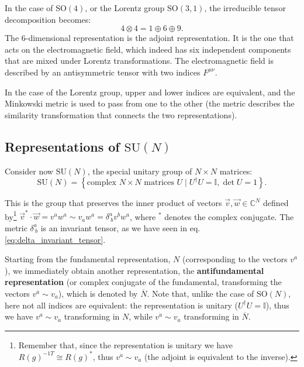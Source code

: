 \begin{example}

    In the case of \(\mathrm{SO}(4)\), or the Lorentz group \(\mathrm{SO}(3,1)\), the irreducible tensor decomposition becomes:
    \[
        4 \otimes 4 = 1 \oplus 6 \oplus 9 .
    \]
    The 6-dimensional representation is the adjoint representation. It is the one that acts on the electromagnetic field, which indeed has six independent components that are mixed under Lorentz transformations. The electromagnetic field is described by an antisymmetric tensor with two indices \(F^{\mu\nu}\).

    In the case of the Lorentz group, upper and lower indices are equivalent, and the Minkowski metric is used to pass from one to the other (the metric describes the similarity transformation that connects the two representations).
\end{example}

\subsection{Representations of \texorpdfstring{\(\mathrm{SU}(N)\)}{SU(N)}}

Consider now \(\mathrm{SU}(N)\), the special unitary group of \(N\times N\) matrices:
\[
    \mathrm{SU}(N) = \left\{ \text{complex } N \times N \text{ matrices } U \mid U^\dagger U = \mathbb{I}, \det U = 1 \right\}.
\]

This is the group that preserves the inner product of vectors \(\vec{v}, \vec{w} \in \mathbb{C}^N\) defined by\footnote{Remember that, since the representation is unitary we have \(R(g)^{-1T} \cong R(g)^*\), thus \(v^{\dot{a}} \sim v_a\) (the adjoint is equivalent to the inverse).} \(\vec{v}^* \cdot \vec{w} = v^{\dot{a}} w^a \sim v_a w^a = \delta^a_{\ b} v^b w^a\), where \(^*\) denotes the complex conjugate. The metric \(\delta^a_{\ b}\) is an invariant tensor, as we have seen in eq. \eqref{eq:delta_invariant_tensor}.

Starting from the fundamental representation, \(N\) (corresponding to the vectors \(v^a\)), we immediately obtain another representation, the \textbf{antifundamental representation} (or complex conjugate of the fundamental, transforming the vectors \(v^{\dot{a}} \sim v_a\)), which is denoted by \(\overline{N}\). Note that, unlike the case of \(\mathrm{SO}(N)\), here not all indices are equivalent: the representation is unitary (\(U^{\dagger} U = \mathbb{I}\)), thus we have \(v^{a} \sim v_{\dot{a}}\) transforming in \(N\), while \(v^{\dot{a}} \sim v_a\) transforming in \(\overline{N}\).

